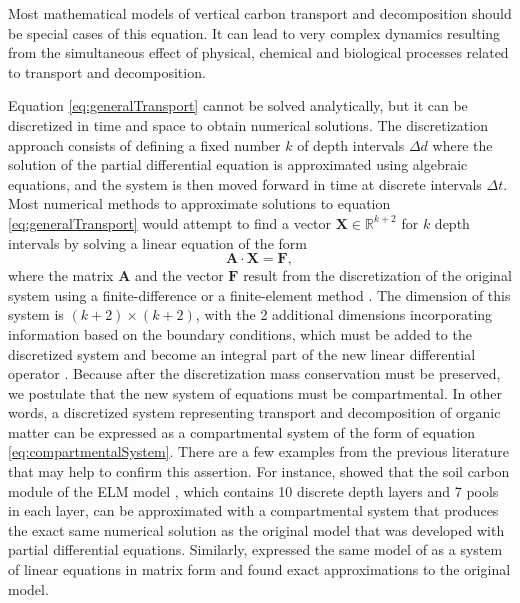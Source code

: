 \documentclass[11pt, oneside, a4paper]{article}   	%
\begin{document}
Most mathematical models of vertical carbon transport and decomposition should be special cases of this equation. It can lead to very complex dynamics resulting from the simultaneous effect of physical, chemical and biological processes related to transport and decomposition. 

Equation \ref{eq:generalTransport} cannot be solved analytically, but it can be discretized in time and space to obtain numerical solutions. The discretization approach consists of defining a fixed number $k$ of depth intervals $\Delta d$ where the solution of the partial differential equation is approximated using algebraic equations, and the system is then moved forward in time at discrete intervals $\Delta t$. Most numerical methods to approximate solutions to equation \ref{eq:generalTransport} would attempt to find a vector $\bm{X} \in \mathbb{R}^{k+2}$ for $k$ depth intervals by solving a linear equation of the form
\begin{equation} \label{eq:discreteSystem}
\mathbf{A} \cdot \bm{X} = \bm{F},
\end{equation}
where the matrix $\mathbf{A}$ and the vector $\bm{F}$ result from the discretization of the original system using a finite-difference or a finite-element method \citep{Lanczos,LeVeque2007}. The dimension of this system is $(k+2) \times (k+2)$, with the 2 additional dimensions incorporating information based on the boundary conditions, which must be added to the discretized system and become an integral part of the new linear differential operator \citep{Lanczos}. Because after the discretization mass conservation must be preserved, we postulate that the new system of equations must be compartmental. In other words, a discretized system representing transport and decomposition of organic matter can be expressed as a compartmental system of the form of equation \ref{eq:compartmentalSystem}. There are a few examples from the previous literature that may help to confirm this assertion. For instance, \citet{Metzler2020JAMES} showed that the soil carbon module of the ELM model \citep{Koven2013BGS}, which contains 10 discrete depth layers and 7 pools in each layer, can be approximated with a compartmental system that produces the exact same numerical solution as the original model that was developed with partial differential equations. Similarly, \citep{Huang2018} expressed the same model of \citet{Koven2013BGS} as a system of linear equations in matrix form and found exact approximations to the original model.
\end{document}
